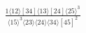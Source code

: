 \documentclass[varwidth, border=5pt]{standalone}
\begin{document}
\begin{my}
$\begin{gathered}
\scriptscriptstyle\frac{1⟨12⟩[34]⟨13⟩[24]⟨25⟩^3}{⟨15⟩^3⟨23⟩⟨24⟩⟨34⟩[45]^2}
\end{gathered}$
\end{my}
\end{document}
